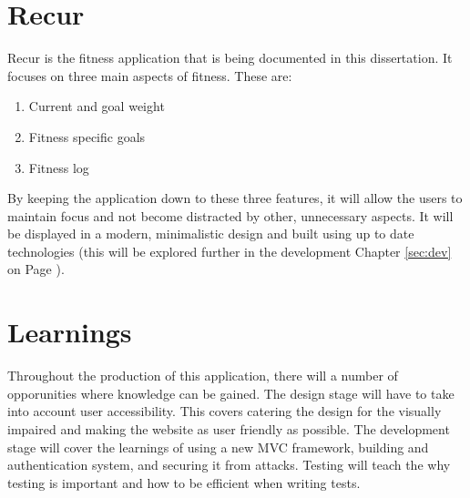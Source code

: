 \section{Recur}
Recur is the fitness application that is being documented in this dissertation. It focuses on three main aspects of fitness. These are:

\begin{enumerate}
\item {Current and goal weight}
\item {Fitness specific goals}
\item {Fitness log}
\end{enumerate}

\noindent
By keeping the application down to these three features, it will allow the users to maintain focus and not become distracted by other, unnecessary aspects. It will be displayed in a modern, minimalistic design and built using up to date technologies (this will be explored further in the development Chapter \ref{sec:dev} on Page \pageref{sec:dev}).\\

\section{Learnings}
Throughout the production of this application, there will a number of opporunities where knowledge can be gained. The design stage will have to take into account user accessibility. This covers catering the design for the visually impaired and making the website as user friendly as possible. The development stage will cover the learnings of using a new MVC framework, building and authentication system, and securing it from attacks. Testing will teach the why testing is important and how to be efficient when writing tests.\\

